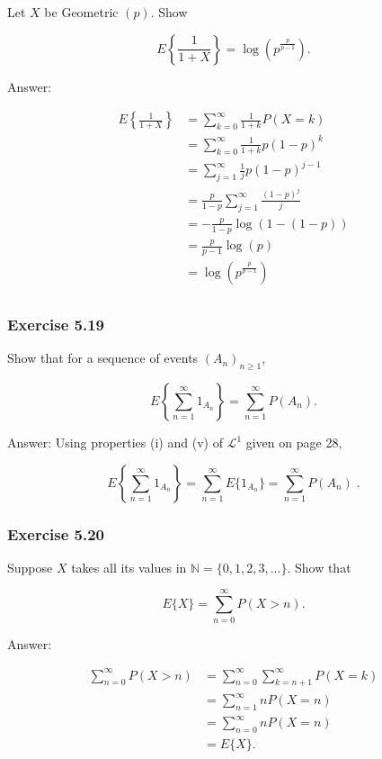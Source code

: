 \documentclass{article}
\begin{document}
{Let $X$ be Geometric $(p)$. Show 

$$
E\left\lbrace\frac{1}{1+X}\right\rbrace = \log\left(p^{\frac{p}{p-1}}\right).
$$

Answer:

\begin{align*}
E\left\lbrace\frac{1}{1+X}\right\rbrace
&= \sum_{k = 0}^\infty \frac{1}{1+k} P\left(X = k \right) \\
&= \sum_{k=0}^\infty \frac{1}{1+k} p(1-p)^k \\
&= \sum_{j=1}^\infty \frac{1}{j}p(1-p)^{j-1} \\
&= \frac{p}{1-p}\sum_{j=1}^\infty \frac{(1-p)^j}{j} \\
&= -\frac{p}{1-p}\log(1 - (1-p)) \\
&= \frac{p}{p-1}\log(p) \\
&= \log \left(p^{\frac{p}{p-1}}\right) \\
\end{align*}





\subsubsection*{Exercise 5.19}

Show that for a sequence of events $(A_n)_{n\geq 1}$, 

$$
E\left\lbrace \sum_{n=1}^\infty 1_{A_n} \right\rbrace
= \sum_{n=1}^\infty P(A_n) .
$$

Answer: Using properties (i) and (v) of $\mathcal{L}^1$ given on page 28,

$$
E\left\lbrace \sum_{n=1}^\infty 1_{A_n} \right\rbrace
= \sum_{n=1}^\infty E\{1_{A_n} \}
= \sum_{n=1}^\infty P(A_n) \;.
$$

\subsubsection*{Exercise 5.20}

Suppose $X$ takes all its values in $\mathbb{N} = \{0, 1, 2, 3,...\}$. Show that

$$
E\{X\} = \sum_{n=0}^\infty P(X > n).
$$

Answer:

\begin{align*}
\sum_{n=0}^\infty P(X > n) &= \sum_{n=0}^\infty \sum_{k = n+1}^\infty P(X = k) \\
&= \sum_{n=1}^\infty nP(X = n) \\
&= \sum_{n=0}^\infty nP(X = n) \\
&= E\{X\}.
\end{align*}

}
\end{document}

